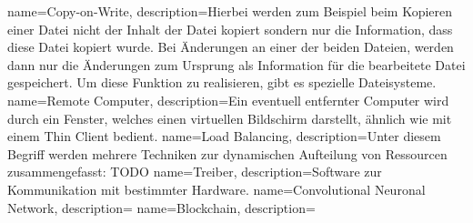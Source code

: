 {
    name={Copy-on-Write},
    description={Hierbei werden zum Beispiel beim Kopieren einer Datei nicht der Inhalt der Datei kopiert sondern nur die Information, dass diese Datei kopiert wurde. Bei Änderungen an einer der beiden Dateien, werden dann nur die Änderungen zum Ursprung als Information für die bearbeitete Datei gespeichert. Um diese Funktion zu realisieren, gibt es spezielle Dateisysteme.}
}
{
    name={Remote Computer},
    description={Ein eventuell entfernter Computer wird durch ein Fenster, welches einen virtuellen Bildschirm darstellt, ähnlich wie mit einem Thin Client bedient.}
}
{
    name={Load Balancing},
    description={Unter diesem Begriff werden mehrere Techniken zur dynamischen Aufteilung von Ressourcen zusammengefasst: TODO}
}
{
    name={Treiber},
    description={Software zur Kommunikation mit bestimmter Hardware.}
}
{
    name={Convolutional Neuronal Network},
    description={}
}
{
    name={Blockchain},
    description={}
}


